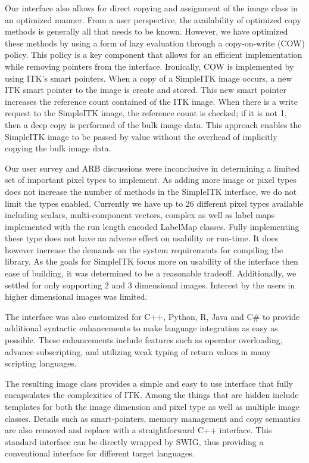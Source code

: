 \documentclass{frontiersMED} %
\begin{document}
Our interface also allows for direct copying and assignment of the
image class in an optimized manner. From a user perspective, the
availability of optimized copy methods is generally all that needs to
be known. However, we have optimized these methods by using a form of
lazy evaluation through a copy-on-write (COW)  policy. This policy is
a key component that allows for an efficient implementation while
removing pointers from the interface. Ironically, COW is implemented
by using ITK's smart pointers. When a copy of a SimpleITK image
occurs, a new ITK smart pointer to the image is create and
stored. This new smart pointer increases the reference count contained
of the ITK image. When there is a write request to the SimpleITK
image, the reference count is checked; if it is not 1, then a deep
copy is performed of the bulk image data. This approach enables the
SimpleITK image to be passed by value without the overhead of
implicitly copying the bulk image data.

Our user survey and ARB discussions were inconclusive in determining a
limited set of important pixel types to implement. As adding more
image or pixel types does not increase the number of methods in the
SimpleITK interface, we do not limit the types enabled. Currently we
have up to 26 different pixel types available including scalars,
multi-component vectors, complex as well as label maps implemented
with the run length encoded LabelMap classes. Fully implementing these
type does not have an adverse effect on usability or run-time. It does
however increase the demands on the system requirements for compiling
the library. As the goals for SimpleITK focus more on usability of the
interface then ease of building, it was determined to be a reasonable
tradeoff. Additionally, we settled for only supporting 2 and 3
dimensional images. Interest by the users in higher dimensional images
was limited.

The interface was also customized for C++, Python, R, Java and C\# to
provide additional syntactic enhancements to make language integration
as easy as possible. These enhancements include features such as
operator overloading, advance subscripting, and utilizing weak typing
of return values in many scripting languages.

The resulting image class provides a simple and easy to use interface
that fully encapsulates the complexities of ITK. Among the things that
are hidden include templates for both the image dimension and pixel
type as well as multiple image classes. Details such as
smart-pointers, memory management and copy semantics are also removed
and replace with a straightforward C++ interface. This standard
interface can be directly wrapped by SWIG, thus providing a
conventional interface for different target languages.
\end{document}
